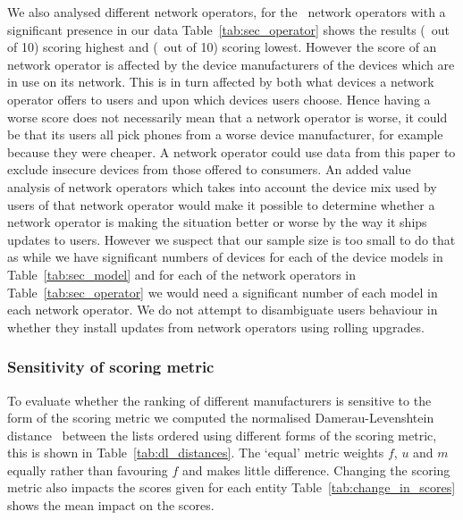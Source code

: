 \daTabSecScoresoperator
We also analysed different network operators, for the \daNumSigOperators\ network operators with a significant presence in our data Table~\ref{tab:sec_operator} shows the results \emph{\daSecScoreBestoperator} (\daSecScoreBestoperatorScore\ out of 10) scoring highest and \emph{\daSecScoreWorstoperator} (\daSecScoreWorstoperatorScore\ out of 10) scoring lowest.
However the score of an network operator is affected by the device manufacturers of the devices which are in use on its network.
This is in turn affected by both what devices a network operator offers to users and upon which devices users choose.
Hence having a worse score does not necessarily mean that a network operator is worse, it could be that its users all pick phones from a worse device manufacturer, for example because they were cheaper.
A network operator could use data from this paper to exclude insecure devices from those offered to consumers.
An added value analysis of network operators which takes into account the device mix used by users of that network operator would make it possible to determine whether a network operator is making the situation better or worse by the way it ships updates to users.
However we suspect that our sample size is too small to do that as while we have significant numbers of devices for each of the device models in Table~\ref{tab:sec_model} and for each of the network operators in Table~\ref{tab:sec_operator} we would need a significant number of each model in each network operator.
We do not attempt to disambiguate users behaviour in whether they install updates from network operators using rolling upgrades.

\subsubsection{Sensitivity of scoring metric}
\daTabDLDistances
\daTabChangeInScores
To evaluate whether the ranking of different manufacturers is sensitive to the form of the scoring metric we computed the normalised Damerau-Levenshtein distance~\cite{Bard2007} between the lists ordered using different forms of the scoring metric, this is shown in Table~\ref{tab:dl_distances}.
The `equal' metric weights $f$, $u$ and $m$ equally rather than favouring $f$ and makes little difference.
Changing the scoring metric also impacts the scores given for each entity Table~\ref{tab:change_in_scores} shows the mean impact on the scores.

